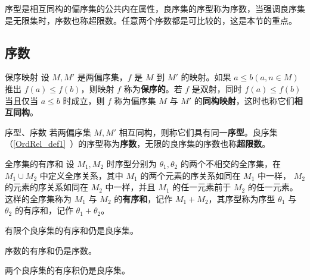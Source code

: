 序型是相互同构的偏序集的公共内在属性，良序集的序型称为序数，当强调良序集是无限集时，序数也称超限数。任意两个序数都是可比较的，这是本节的重点。
\subsection{序数}
\begin{definition}{保序映射}
设 $M,M'$ 是两偏序集，$f$ 是 $M$ 到 $M'$ 的映射。如果 $a\leq b(a,n\in M)$ 推出 $f(a)\leq f(b)$，则映射 $f$ 称为\textbf{保序的}。若 $f$ 是双射，同时 $f(a)\leq f(b)$ 当且仅当 $a\leq b$ 时成立，则 $f$ 称为偏序集 $M$ 与 $M'$ 的\textbf{同构映射}，这时也称它们\textbf{相互同构}。
\end{definition}
\begin{definition}{序型、序数}
若两偏序集 $M,M'$ 相互同构，则称它们具有同一\textbf{序型}。良序集（\autoref{OrdRel_def1}~）的序型称为\textbf{序数}，无限的良序集的序数也称\textbf{超限数}。
\end{definition}
\begin{definition}{全序集的有序和}
设 $M_1,M_2$ 时序型分别为 $\theta_1,\theta_2$ 的两个不相交的全序集，在 $M_1\cup M_2$ 中定义全序关系，其中 $M_1$ 的两个元素的序关系如同在 $M_1$ 中一样， $M_2$ 的元素的序关系如同在 $M_2$ 中一样，并且 $M_1$ 的任一元素前于 $M_2$ 的任一元素。这样的全序集称为 $M_1$ 与 $M_2$ 的\textbf{有序和}，记作 $M_1+M_2$，其序型称为序型 $\theta_1$ 与 $\theta_2$ 的有序和，记作 $\theta_1+\theta_2$。
\end{definition}
\begin{theorem}{}
有限个良序集的有序和仍是良序集。
\end{theorem}
\begin{corollary}{}
序数的有序和仍是序数。
\end{corollary}
\begin{theorem}{}
两个良序集的有序积仍是良序集。
\end{theorem}